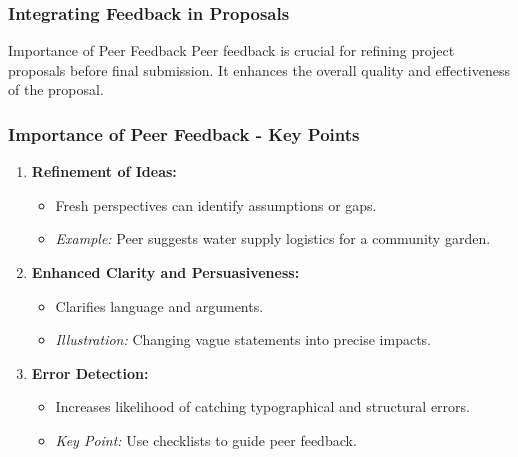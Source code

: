 \documentclass[aspectratio=169]{beamer}
\begin{document}
\begin{frame}[fragile]
    \frametitle{Integrating Feedback in Proposals}
    \begin{block}{Importance of Peer Feedback}
        Peer feedback is crucial for refining project proposals before final submission. It enhances the overall quality and effectiveness of the proposal.
    \end{block}
\end{frame}

\begin{frame}[fragile]
    \frametitle{Importance of Peer Feedback - Key Points}
    \begin{enumerate}
        \item \textbf{Refinement of Ideas:}
              \begin{itemize}
                  \item Fresh perspectives can identify assumptions or gaps.
                  \item \textit{Example:} Peer suggests water supply logistics for a community garden.
              \end{itemize}
              
        \item \textbf{Enhanced Clarity and Persuasiveness:}
              \begin{itemize}
                  \item Clarifies language and arguments.
                  \item \textit{Illustration:} Changing vague statements into precise impacts.
              \end{itemize}
        
        \item \textbf{Error Detection:}
              \begin{itemize}
                  \item Increases likelihood of catching typographical and structural errors.
                  \item \textit{Key Point:} Use checklists to guide peer feedback.
              \end{itemize}
    \end{enumerate}
\end{frame}
\end{document}
